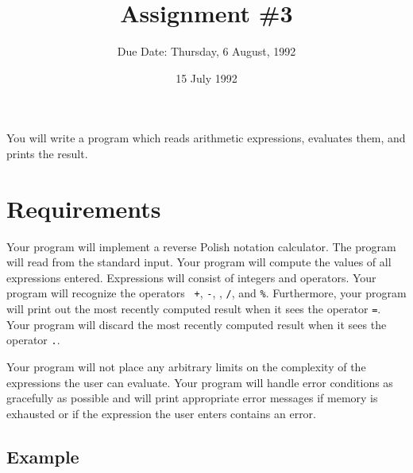 

\def\brac#1{$<$#1$>$}
\def\Int{{\tt int}}
\def\int{\brac{\Int}}
\def\int{\brac{\Int}}
\def\Shortint{{\tt short~int}}
\def\shortint{\brac{\Shortint}}
\def\Longint{{\tt long~int}}
\def\longint{\brac{\Longint}}
\def\Float{{\tt float}}
\def\float{\brac{\Float}}
\def\Double{{\tt double}}
\def\double{\brac{\Double}}
\def\Char{{\tt char}}
\def\chr{\brac{\Char}}
\def\Void{{\tt void}}
\def\void{\brac{\Void}}

\def\ptr#1{pointer~to #1}
\def\p2#1{\brac{\ptr#1}}
\def\Ano#1#2{array~of {#1}~#2s}
\def\ano#1#2{\brac{\Ano#1#2}}
\def\Ao#1{array~of #1}
\def\ao#1{\brac{\Ao#1}}

\def\np{{\tt NULL} pointer}

\def\breakhere{\mbox{$\otimes$}}

\title{Assignment \#3}
\author{Due Date: Thursday, 6 August, 1992}
\date{15 July 1992}

\parskip 8pt


\maketitle

    You will write a program which reads arithmetic expressions,
evaluates them, and prints the result.

\section{Requirements}

Your program will implement a reverse Polish notation calculator.  The
program will read from the standard input.  Your program will compute
the values of all expressions entered.  Expressions will consist of
integers and operators.  Your program will recognize the operators {\tt
+}, {\tt -}, {\tt *}, {\tt /}, and {\tt \%}.  Furthermore, your program
will print out the most recently computed result when it sees the
operator {\tt =}.  Your program will discard the most recently computed
result when it sees the operator {\tt .}.  

Your program will not place any arbitrary limits on the complexity of
the expressions the user can evaluate.  Your program will handle error
conditions as gracefully as possible and will print appropriate error
messages if memory is exhausted or if the expression the user enters
contains an error.

\subsection{Example}

